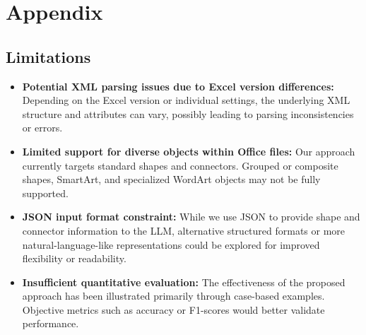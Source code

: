 \newpage


\appendix
\section*{Appendix}
\renewcommand{\thesubsection}{A.\arabic{subsection}}

\subsection{Limitations}
\begin{itemize}
\item \textbf{Potential XML parsing issues due to Excel version differences:} Depending on the Excel version or individual settings, the underlying XML structure and attributes can vary, possibly leading to parsing inconsistencies or errors.
\item \textbf{Limited support for diverse objects within Office files:} Our approach currently targets standard shapes and connectors. Grouped or composite shapes, SmartArt, and specialized WordArt objects may not be fully supported.
\item \textbf{JSON input format constraint:} While we use JSON to provide shape and connector information to the LLM, alternative structured formats or more natural-language-like representations could be explored for improved flexibility or readability.
\item \textbf{Insufficient quantitative evaluation:} The effectiveness of the proposed approach has been illustrated primarily through case-based examples. Objective metrics such as accuracy or F1-scores would better validate performance.
\end{itemize}

